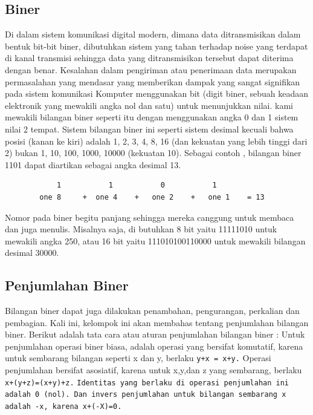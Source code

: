 \subsection {Biner}
Di dalam sistem komunikasi digital modern, dimana data ditransmisikan dalam bentuk bit-bit biner, dibutuhkan sistem yang tahan terhadap noise yang terdapat di kanal transmisi sehingga data yang ditransmisikan tersebut dapat diterima dengan benar. Kesalahan dalam pengiriman atau penerimaan data merupakan permasalahan yang mendasar yang memberikan dampak yang sangat signifikan pada sistem komunikasi
Komputer menggunakan bit (digit biner, sebuah keadaan elektronik yang mewakili angka nol dan satu) untuk menunjukkan nilai. kami mewakili bilangan biner seperti itu dengan menggunakan angka 0 dan 1 sistem nilai 2 tempat. Sistem bilangan biner ini seperti sistem desimal kecuali bahwa posisi (kanan ke kiri) adalah 1, 2, 3, 4, 8, 16 (dan kekuatan yang lebih tinggi dari 2) bukan 1, 10, 100, 1000, 10000 (kekuatan 10). Sebagai contoh , bilangan biner 1101 dapat diartikan sebagai angka desimal 13\cite{dosen2013matematika}.
		\begin{verbatim}
			1			1			0			1
		one 8	  +	 one 4	  +	  one 2    +   one 1 	= 13
		\end{verbatim}
	Nomor pada  biner begitu panjang sehingga mereka canggung  untuk membaca dan juga menulis. Misalnya saja, di butuhkan 8 bit yaitu  11111010 untuk mewakili angka 250, atau 16 bit yaitu 111010100110000 untuk mewakili bilangan desimal 30000.


\subsection {Penjumlahan Biner}
Bilangan biner dapat juga dilakukan penambahan, pengurangan, perkalian dan pembagian. Kali ini, kelompok ini akan membahas tentang penjumlahan bilangan biner. Berikut adalah tata cara atau aturan penjumlahan bilangan biner :
Untuk penjumlahan operasi biner biasa, adalah operasi yang bersifat komutatif, karena untuk sembarang bilangan seperti x dan y, berlaku \verb|y+x = x+y.| Operasi penjumlahan bersifat asosiatif, karena untuk x,y,dan z yang sembarang, berlaku \verb|x+(y+z)=(x+y)+z.| \verb|Identitas yang berlaku di operasi penjumlahan ini adalah 0 (nol). Dan invers penjumlahan untuk bilangan sembarang x adalah -x, karena x+(-X)=0.|

